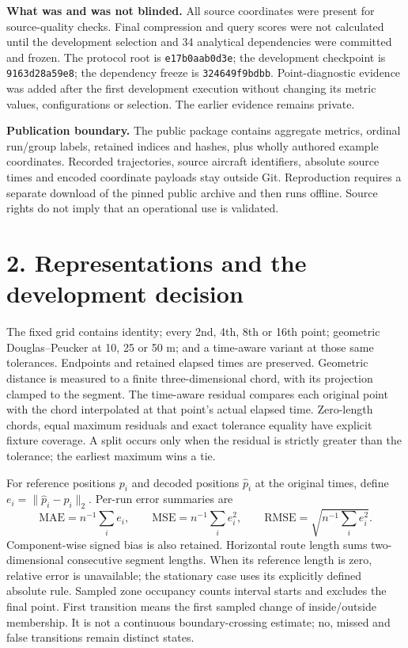 \documentclass[11pt]{article}
\begin{document}
\textbf{What was and was not blinded.} All source coordinates were present for source-quality checks. Final compression and query scores were not calculated until the development selection and 34 analytical dependencies were committed and frozen. The protocol root is \texttt{e17b0aab0d3e}; the development checkpoint is \texttt{9163d28a59e8}; the dependency freeze is \texttt{324649f9bdbb}. Point-diagnostic evidence was added after the first development execution without changing its metric values, configurations or selection. The earlier evidence remains private.

\textbf{Publication boundary.} The public package contains aggregate metrics, ordinal run/group labels, retained indices and hashes, plus wholly authored example coordinates. Recorded trajectories, source aircraft identifiers, absolute source times and encoded coordinate payloads stay outside Git. Reproduction requires a separate download of the pinned public archive and then runs offline. Source rights do not imply that an operational use is validated.

\clearpage
\section*{2. Representations and the development decision}
The fixed grid contains identity; every 2nd, 4th, 8th or 16th point; geometric Douglas--Peucker at 10, 25 or 50 m; and a time-aware variant at those same tolerances. Endpoints and retained elapsed times are preserved. Geometric distance is measured to a finite three-dimensional chord, with its projection clamped to the segment. The time-aware residual compares each original point with the chord interpolated at that point's actual elapsed time. Zero-length chords, equal maximum residuals and exact tolerance equality have explicit fixture coverage. A split occurs only when the residual is strictly greater than the tolerance; the earliest maximum wins a tie.

For reference positions $p_i$ and decoded positions $\hat p_i$ at the original times, define $e_i=\|\hat p_i-p_i\|_2$. Per-run error summaries are
\[
 \mathrm{MAE}=n^{-1}\sum_i e_i,\qquad
 \mathrm{MSE}=n^{-1}\sum_i e_i^2,\qquad
 \mathrm{RMSE}=\sqrt{n^{-1}\sum_i e_i^2}.
\]
Component-wise signed bias is also retained. Horizontal route length sums two-dimensional consecutive segment lengths. When its reference length is zero, relative error is unavailable; the stationary case uses its explicitly defined absolute rule. Sampled zone occupancy counts interval starts and excludes the final point. First transition means the first sampled change of inside/outside membership. It is not a continuous boundary-crossing estimate; no, missed and false transitions remain distinct states.
\end{document}
